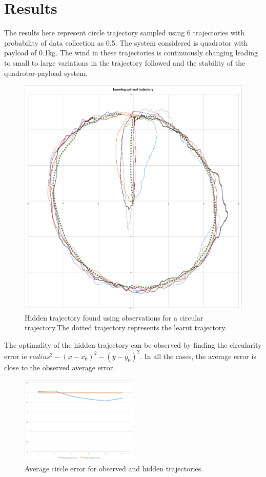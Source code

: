 \documentclass[hidelinks,BTech]{iitmdiss}
\begin{document}
\section{Results}
The results here represent circle trajectory sampled using 6 trajectories with probability of data collection as 0.5. The system considered is quadrotor with payload of 0.1kg. The wind in these trajectories is continuously changing leading to small to large variations in the trajectory followed and the stability of the quadrotor-payload system. 

\begin{figure}[H]
  \centering
    \includegraphics[width=\textwidth]{Apprenticeship_hidden_trajectory.png}
    \caption{Hidden trajectory found using observations for a circular trajectory.The dotted trajectory represents the learnt trajectory.}
\end{figure}

The optimality of the hidden trajectory can be observed by finding the circularity error ie $radius^2 - (x-x_0)^2 - (y-y_0)^2$. In all the cases, the average error is close to the observed average error.
\begin{figure}[H]
  \centering
    \includegraphics[width=0.5\textwidth]{Apprenticeship_optimality_graph.png}
    \caption{Average circle error for observed and hidden trajectories.}
\end{figure}	
\end{document}
